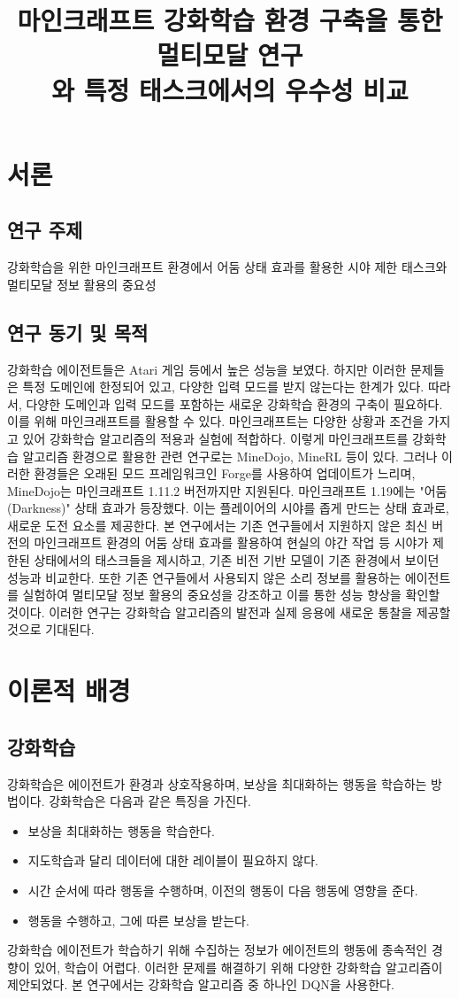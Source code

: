 \documentclass{tudelftposter}
\title{마인크래프트 강화학습 환경 구축을 통한 멀티모달 연구\\
\large 와 특정 태스크에서의 우수성 비교}
\begin{document}
\section{서론}
\subsection{연구 주제}
강화학습을 위한 마인크래프트 환경에서 어둠 상태 효과를 활용한 시야 제한 태스크와 멀티모달 정보 활용의 중요성

\subsection{연구 동기 및 목적}
강화학습 에이전트들은 Atari 게임 등에서 높은 성능을 보였다. 하지만 이러한 문제들은 특정 도메인에 한정되어 있고, 다양한 입력 모드를 받지 않는다는 한계가 있다. 따라서, 다양한 도메인과 입력 모드를 포함하는 새로운 강화학습 환경의 구축이 필요하다. 이를 위해 마인크래프트를 활용할 수 있다. 마인크래프트는 다양한 상황과 조건을 가지고 있어 강화학습 알고리즘의 적용과 실험에 적합하다. 이렇게 마인크래프트를 강화학습 알고리즘 환경으로 활용한 관련 연구로는 MineDojo, MineRL 등이 있다. 그러나 이러한 환경들은 오래된 모드 프레임워크인 Forge를 사용하여 업데이트가 느리며, MineDojo는 마인크래프트 1.11.2 버전까지만 지원된다. 마인크래프트 1.19에는 "어둠(Darkness)" 상태 효과가 등장했다. 이는 플레이어의 시야를 좁게 만드는 상태 효과로, 새로운 도전 요소를 제공한다. 본 연구에서는 기존 연구들에서 지원하지 않은 최신 버전의 마인크래프트 환경의 어둠 상태 효과를 활용하여 현실의 야간 작업 등 시야가 제한된 상태에서의 태스크들을 제시하고, 기존 비전 기반 모델이 기존 환경에서 보이던 성능과 비교한다. 또한 기존 연구들에서 사용되지 않은 소리 정보를 활용하는 에이전트를 실험하여 멀티모달 정보 활용의 중요성을 강조하고 이를 통한 성능 향상을 확인할 것이다. 이러한 연구는 강화학습 알고리즘의 발전과 실제 응용에 새로운 통찰을 제공할 것으로 기대된다.

\section{이론적 배경}
\subsection{강화학습}
강화학습은 에이전트가 환경과 상호작용하며, 보상을 최대화하는 행동을 학습하는 방법이다. 강화학습은 다음과 같은 특징을 가진다.
\begin{itemize}
  \item 보상을 최대화하는 행동을 학습한다.
  \item 지도학습과 달리 데이터에 대한 레이블이 필요하지 않다.
  \item 시간 순서에 따라 행동을 수행하며, 이전의 행동이 다음 행동에 영향을 준다.
  \item 행동을 수행하고, 그에 따른 보상을 받는다.
\end{itemize}
강화학습 에이전트가 학습하기 위해 수집하는 정보가 에이전트의 행동에 종속적인 경향이 있어, 학습이 어렵다. 이러한 문제를 해결하기 위해 다양한 강화학습 알고리즘이 제안되었다. 본 연구에서는 강화학습 알고리즘 중 하나인 DQN을 사용한다.
\end{document}
